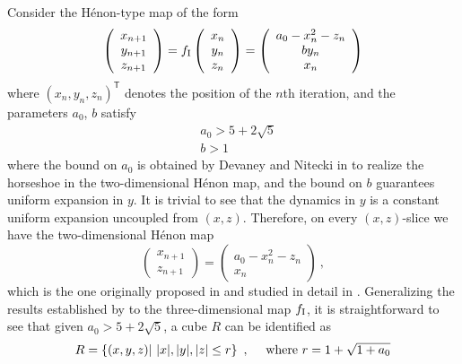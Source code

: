 \documentclass[12pt]{iopart}
\begin{document}
Consider the H\'{e}non-type map of the form 
\begin{equation}\label{eq:3D singly folded Henon}
\left( \begin{array}{ccc}
x_{n+1}\\
y_{n+1} \\
z_{n+1} \end{array} \right) = 
f_{\rm I} \left( \begin{array}{ccc}
x_{n}\\
y_{n} \\
z_{n} \end{array} \right) =
\left( \begin{array}{ccc}
a_0 - x^2_n - z_n\\
b y_n \\
x_n \end{array} \right)
\end{equation}
where $(x_n,y_n,z_n)^\mathsf{T}$ denotes the position of the $n$th iteration, and the parameters $a_0$, $b$ satisfy  
\begin{eqnarray}
& a_0  > 5+2\sqrt{5} \nonumber \\
& b > 1   \nonumber
\end{eqnarray}
where the bound on $a_0$ is obtained by Devaney and Nitecki in \cite{Devaney79} to realize the horseshoe in the two-dimensional H\'{e}non map, and the bound on $b$ guarantees uniform expansion in $y$. It is trivial to see that the dynamics in $y$ is a constant uniform expansion uncoupled from $(x,z)$. Therefore, on every $(x,z)$-slice we have the two-dimensional H\'{e}non map
\begin{equation}\label{eq:2D Henon}
\left( \begin{array}{ccc}
x_{n+1}\\
z_{n+1} \end{array} \right) = 
\left( \begin{array}{ccc}
a_0 - x^2_n - z_n\\
x_n
 \end{array} \right)\ ,
\end{equation}
which is the one originally proposed in \cite{Henon76} and studied in detail in \cite{Devaney79}. Generalizing the results established by \cite{Devaney79} to the three-dimensional map $f_{\rm I}$, it is straightforward to see that given $a_0>5+2\sqrt{5}$, a cube $R$ can be identified as
\begin{equation}\label{eq:Devaney V definition}
R = \left\lbrace (x,y,z) \middle|\  |x|,|y|,|z|\leq r \right\rbrace\ , ~~~~{\rm where\ }r=1+\sqrt{1+a_0}
\end{equation}
\end{document}
